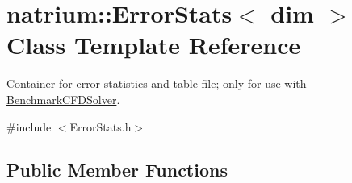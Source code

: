 \hypertarget{classnatrium_1_1ErrorStats}{\section{natrium\-:\-:Error\-Stats$<$ dim $>$ Class Template Reference}
\label{classnatrium_1_1ErrorStats}
}


Container for error statistics and table file; only for use with \hyperlink{classnatrium_1_1BenchmarkCFDSolver}{Benchmark\-C\-F\-D\-Solver}.  




{\ttfamily \#include $<$Error\-Stats.\-h$>$}

\subsection*{Public Member Functions}
